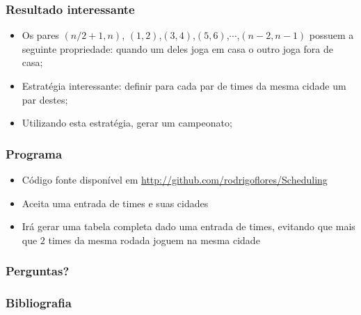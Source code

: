 \documentclass{beamer}
\begin{document}
\begin{frame}
  \frametitle{Resultado interessante}
  \begin{itemize}
    \item Os pares $(n/2 + 1,n)$, $(1,2)$,$(3,4)$,$(5,6)$,$\cdots$,$(n-2,n-1)$ possuem a seguinte propriedade: quando um deles joga em casa o outro joga
    fora de casa;
    \item Estratégia interessante: definir para cada par de times da mesma cidade um par destes;
    \item Utilizando esta estratégia, gerar um campeonato; 
  \end{itemize}
\end{frame}

\begin{frame}
  \frametitle{Programa}
  \begin{itemize}
    \item Código fonte disponível em \url{http://github.com/rodrigoflores/Scheduling}
    \item Aceita uma entrada de times e suas cidades
    \item Irá gerar uma tabela completa dado uma entrada de times, evitando que mais que $2$ times da mesma rodada joguem na mesma cidade
  \end{itemize}
\end{frame}

\begin{frame}
  \frametitle{Perguntas?}
\end{frame}

\begin{frame}
  \frametitle{Bibliografia}
  
  
\end{frame}
\end{document}
